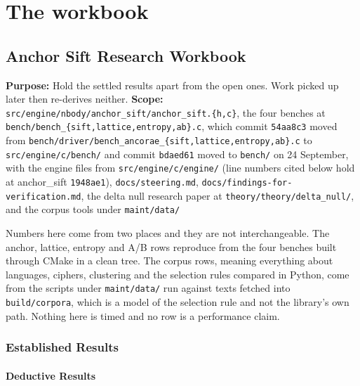 \chapter{The workbook}

\section{Anchor Sift Research Workbook}

\textbf{Purpose:} Hold the settled results apart from the open ones. Work picked up later then re-derives neither. \textbf{Scope:} \texttt{src/\allowbreak{}engine/\allowbreak{}nbody/\allowbreak{}anchor\_sift/\allowbreak{}anchor\_sift.\{h,c\}}, the four benches at \texttt{bench/\allowbreak{}bench\_\{sift,lattice,entropy,ab\}.c}, which commit \texttt{54aa8c3} moved from \texttt{bench/\allowbreak{}driver/\allowbreak{}bench\_ancorae\_\{sift,lattice,entropy,ab\}.c} to \texttt{src/\allowbreak{}engine/\allowbreak{}c/\allowbreak{}bench/} and commit \texttt{bdaed61} moved to \texttt{bench/} on 24 September, with the engine files from \texttt{src/\allowbreak{}engine/\allowbreak{}c/\allowbreak{}engine/} (line numbers cited below hold at anchor\_sift \texttt{1948ae1}), \texttt{docs/\allowbreak{}steering.md}, \texttt{docs/\allowbreak{}findings-\allowbreak{}for-\allowbreak{}verification.md}, the delta null research paper at \texttt{theory/\allowbreak{}theory/\allowbreak{}delta\_null/}, and the corpus tools under \texttt{maint/\allowbreak{}data/\allowbreak{}}

Numbers here come from two places and they are not interchangeable. The anchor, lattice, entropy and A/B rows reproduce from the four benches built through CMake in a clean tree. The corpus rows, meaning everything about languages, ciphers, clustering and the selection rules compared in Python, come from the scripts under \texttt{maint/\allowbreak{}data/\allowbreak{}} run against texts fetched into \texttt{build/\allowbreak{}corpora}, which is a model of the selection rule and not the library's own path. Nothing here is timed and no row is a performance claim.

\subsection{Established Results}

\subsubsection{Deductive Results}


